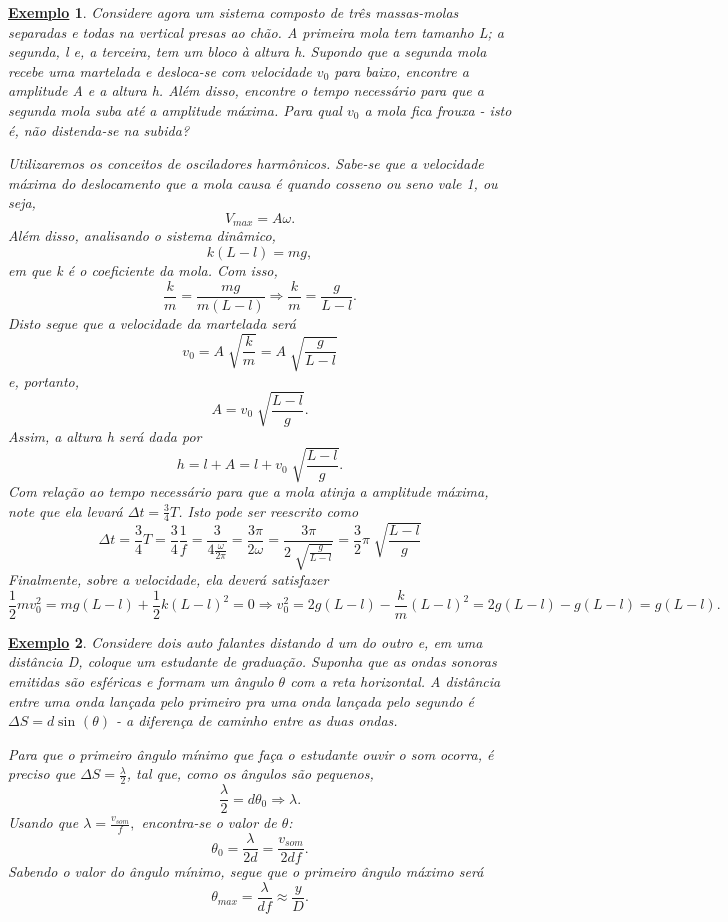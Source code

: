 \documentclass{article}
\newtheorem{example}{\underline{Exemplo}}
\begin{document}
\begin{example}
  Considere agora um sistema composto de três massas-molas separadas e todas na vertical presas ao chão. A primeira mola tem tamanho L; a segunda, l e, a terceira,
  tem um bloco à altura h. Supondo que a segunda mola recebe uma martelada e desloca-se com velocidade \(v_{0}\) para baixo, encontre a amplitude A e a altura h. Além disso,
  encontre o tempo necessário para que a segunda mola suba até a amplitude máxima. Para qual \(v_{0}\) a mola fica frouxa - isto é, não distenda-se na subida?

  Utilizaremos os conceitos de osciladores harmônicos. Sabe-se que a velocidade máxima do deslocamento que a mola causa é quando cosseno ou seno vale 1, ou seja, 
  \[
    V_{max} = A\omega .
  \]
  Além disso, analisando o sistema dinâmico, 
  \[
    k(L-l) = mg,
  \]
  em que k é o coeficiente da mola. Com isso, 
  \[
    \frac{k}{m} = \frac{mg}{m(L-l)} \Rightarrow \frac{k}{m} = \frac{g}{L-l}.
  \]
  Disto segue que a velocidade da martelada será 
  \[
    v_{0}=A\sqrt[]{\frac{k}{m}} = A\sqrt[]{\frac{g}{L-l}}
  \]
  e, portanto, 
  \[
    A = v_{0}\sqrt[]{\frac{L-l}{g}}.
  \]
  Assim, a altura h será dada por 
  \[
    h = l + A = l + v_{0}\sqrt[]{\frac{L-l}{g}}.
  \]
  Com relação ao tempo necessário para que a mola atinja a amplitude máxima, note que ela levará \(\Delta t = \frac{3}{4}T\). Isto pode ser reescrito como 
  \[
    \Delta t = \frac{3}{4}T = \frac{3}{4}\frac{1}{f} = \frac{3}{4\frac{\omega }{2\pi }} = \frac{3\pi }{2\omega } = \frac{3\pi }{2\sqrt[]{\frac{g}{L-l}}} = \frac{3}{2}\pi \sqrt[]{\frac{L-l}{g}}
  \]
  Finalmente, sobre a velocidade, ela deverá satisfazer 
  \[
    \frac{1}{2}mv_{0}^{2} = mg(L-l) + \frac{1}{2}k(L-l)^{2} = 0 \Rightarrow v_{0}^{2} = 2g(L-l) - \frac{k}{m}(L-l)^{2} = 2g(L-l)-g(L-l) = g(L-l).
  \]
\end{example}
\begin{example}
  Considere dois auto falantes distando d um do outro e, em uma distância D, coloque um estudante de graduação. Suponha que as ondas sonoras emitidas são esféricas e formam
  um ângulo \(\theta \) com a reta horizontal. A distância entre uma onda lançada pelo primeiro pra uma onda lançada pelo segundo é \(\Delta S = d\sin^{}{(\theta )}\) - a diferença de caminho entre
  as duas ondas.

  Para que o primeiro ângulo mínimo que faça o estudante ouvir o som ocorra, é preciso que \(\Delta S = \frac{\lambda }{2}\), tal que, como os ângulos são pequenos,
  \[
    \frac{\lambda }{2} = d\theta_{0} \Rightarrow \lambda.
  \]
  Usando que \(\lambda  = \frac{v_{som}}{f},\) encontra-se o valor de \(\theta \): 
  \[
    \theta_{0} = \frac{\lambda }{2d} = \frac{v_{som}}{2df}.
  \]
  Sabendo o valor do ângulo mínimo, segue que o primeiro ângulo máximo será 
  \[
    \theta_{max} = \frac{\lambda }{df}\approx \frac{y}{D}.
  \]
\end{example}
\end{document}
